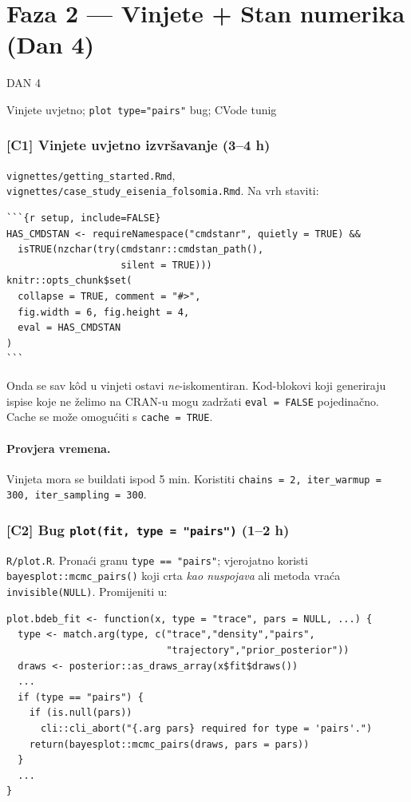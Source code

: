 \documentclass[11pt,a4paper]{article}
\newcommand{\dayhead}[2]{%
  \vspace{0.6em}\par\noindent%
  \colorbox{daygray}{\color{white}\bfseries\strut\;DAN #1\;}\;%
  \colorbox{daylight}{\color{daygray}\strut\;#2\;}\par\vspace{0.4em}%
}
\newcommand{\file}[1]{\texttt{\small #1}}
\newcommand{\code}[1]{\texttt{\small #1}}
\begin{document}
\section{Faza 2 --- Vinjete + Stan numerika (Dan 4)}

\dayhead{4}{Vinjete uvjetno; \texttt{plot type="pairs"} bug;
CVode tunig}

\subsubsection*{[C1] Vinjete uvjetno izvršavanje (3--4 h)}

\file{vignettes/getting\_started.Rmd},
\file{vignettes/case\_study\_eisenia\_folsomia.Rmd}.  Na vrh staviti:

\begin{lstlisting}
```{r setup, include=FALSE}
HAS_CMDSTAN <- requireNamespace("cmdstanr", quietly = TRUE) &&
  isTRUE(nzchar(try(cmdstanr::cmdstan_path(),
                    silent = TRUE)))
knitr::opts_chunk$set(
  collapse = TRUE, comment = "#>",
  fig.width = 6, fig.height = 4,
  eval = HAS_CMDSTAN
)
```
\end{lstlisting}

\noindent Onda se sav kôd u vinjeti ostavi \emph{ne}-iskomentiran.
Kod-blokovi koji generiraju ispise koje ne želimo na CRAN-u
mogu zadržati \code{eval = FALSE} pojedinačno.  Cache se može
omogućiti s \code{cache = TRUE}.

\paragraph{Provjera vremena.}  Vinjeta mora se buildati ispod 5 min.
Koristiti \code{chains = 2, iter\_warmup = 300, iter\_sampling = 300}.

\subsubsection*{[C2] Bug \texttt{plot(fit, type = "pairs")} (1--2 h)}

\file{R/plot.R}.  Pronaći granu \code{type == "pairs"}; vjerojatno
koristi \code{bayesplot::mcmc\_pairs()} koji crta
\emph{kao nuspojava} ali metoda vraća \code{invisible(NULL)}.
Promijeniti u:

\begin{lstlisting}
plot.bdeb_fit <- function(x, type = "trace", pars = NULL, ...) {
  type <- match.arg(type, c("trace","density","pairs",
                            "trajectory","prior_posterior"))
  draws <- posterior::as_draws_array(x$fit$draws())
  ...
  if (type == "pairs") {
    if (is.null(pars))
      cli::cli_abort("{.arg pars} required for type = 'pairs'.")
    return(bayesplot::mcmc_pairs(draws, pars = pars))
  }
  ...
}
\end{lstlisting}
\end{document}
